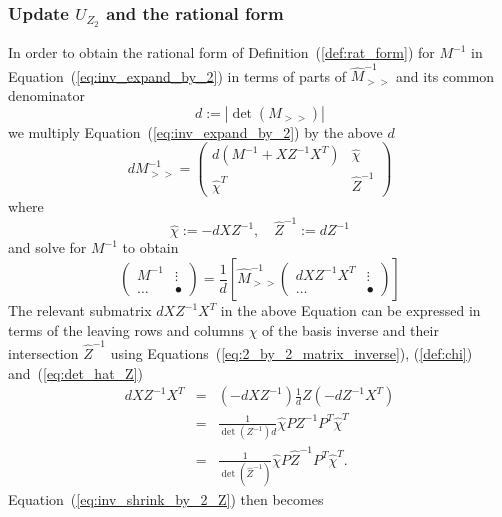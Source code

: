 \documentclass[a4paper]{article}
\begin{document}
\subsubsection{Update $U_{Z_{2}}$ and the rational form}
In order to obtain the rational form of Definition~(\ref{def:rat_form})
for $M^{-1}$ in Equation~(\ref{eq:inv_expand_by_2}) in terms of
parts of $\hat{M}_{>>}^{-1}$ and its common denominator
\begin{equation}
\label{def:old_denom_Z2}
d:=\left|\det(M_{>>})\right|
\end{equation}
we multiply Equation~(\ref{eq:inv_expand_by_2}) by the above $d$ 
\begin{equation}
dM_{>>}^{-1}=
\left(
\begin{array}{c|c}
d\left(M^{-1}+XZ^{-1}X^{T}\right) & \hat{\chi}   \\
\hline
\hat{\chi}^{T}                           & \hat{Z}^{-1}
\end{array}
\right)
\end{equation}
where
\begin{equation}
\label{def:chi}
\hat{\chi}:=-dXZ^{-1},
\quad
\hat{Z}^{-1}:=d Z^{-1}
\end{equation} 
and solve for $M^{-1}$ to obtain
\begin{equation}
\label{eq:inv_shrink_by_2_Z}
\left(
\begin{array}{c|c}
M^{-1} & \vdots \\
\hline
\hdots & \bullet
\end{array}
\right)
=
\frac{1}{d}
\left[
\hat{M}_{>>}^{-1}
\left(
\begin{array}{c|c}
dXZ^{-1}X^{T} & \vdots \\
\hline
\hdots        & \bullet
\end{array}
\right)
\right]
\end{equation}
The relevant submatrix $dXZ^{-1}X^{T}$ in the above Equation can be expressed
in terms of the leaving rows and columns $\hat{\chi}$ of the basis inverse
and their intersection $\hat{Z}^{-1}$ using
Equations~(\ref{eq:2_by_2_matrix_inverse}), (\ref{def:chi})
and~(\ref{eq:det_hat_Z})
\begin{eqnarray}
dXZ^{-1}X^{T}
&=&
\left(-dXZ^{-1}\right)\frac{1}{d}Z\left(-dZ^{-1}X^{T}\right) \\
&=&
\frac{1}{\det(Z^{-1})d}
\hat{\chi} PZ^{-1}P^{T}\hat{\chi}^{T} \\
&=&
\frac{1}{\det(\hat{Z}^{-1})}
\hat{\chi} P\hat{Z}^{-1}P^{T}\hat{\chi}^{T}.
\end{eqnarray}
Equation~(\ref{eq:inv_shrink_by_2_Z}) then becomes
\end{document}
